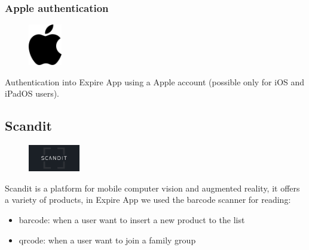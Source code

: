 \subsubsection{Apple authentication}
\begin{figure}
\vspace{-0.8cm}
\includegraphics[width=0.13\textwidth]{Images/external_serv/a.png}
\end{figure}
Authentication into Expire App using a Apple account (possible only for iOS and iPadOS users).\newline

\subsection{Scandit}
\begin{figure}
\vspace{-0.8cm}
\includegraphics[width=0.20\textwidth]{Images/external_serv/scandit.png}
\end{figure}
Scandit is a platform for mobile computer vision and augmented reality, it offers a variety of products, in Expire App we used the barcode scanner for reading:
\begin{itemize}
    \item barcode: when a user want to insert a new product to the list
    \item qrcode: when a user want to join a family group
\end{itemize}
\newpage